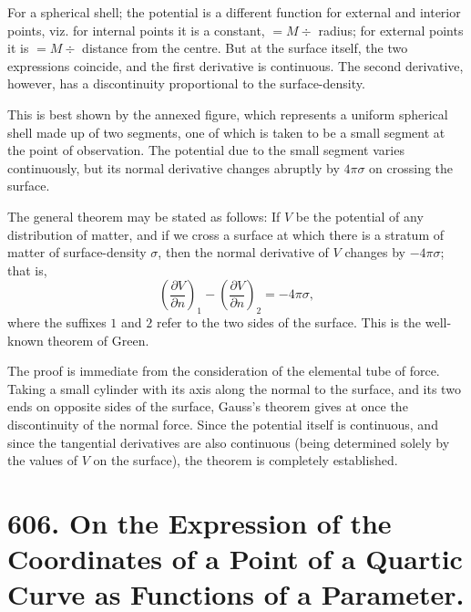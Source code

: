 \documentclass[11pt,a4paper]{book}
\begin{document}
\begin{art}
For a spherical shell; the potential is a different function for external and interior points, viz. for internal points it is a constant, $= M \div$ radius; for external points it is $= M \div$ distance from the centre. But at the surface itself, the two expressions coincide, and the first derivative is continuous. The second derivative, however, has a discontinuity proportional to the surface-density.
\end{art}

\begin{art}
This is best shown by the annexed figure, which represents a uniform spherical shell made up of two segments, one of which is taken to be a small segment at the point of observation. The potential due to the small segment varies continuously, but its normal derivative changes abruptly by $4\pi\sigma$ on crossing the surface.
\end{art}

\begin{art}
The general theorem may be stated as follows: If $V$ be the potential of any distribution of matter, and if we cross a surface at which there is a stratum of matter of surface-density $\sigma$, then the normal derivative of $V$ changes by $-4\pi\sigma$; that is,
\[
\left(\frac{\partial V}{\partial n}\right)_1 - \left(\frac{\partial V}{\partial n}\right)_2 = -4\pi\sigma,
\]
where the suffixes $1$ and $2$ refer to the two sides of the surface. This is the well-known theorem of Green.
\end{art}

\begin{art}
The proof is immediate from the consideration of the elemental tube of force. Taking a small cylinder with its axis along the normal to the surface, and its two ends on opposite sides of the surface, Gauss's theorem gives at once the discontinuity of the normal force. Since the potential itself is continuous, and since the tangential derivatives are also continuous (being determined solely by the values of $V$ on the surface), the theorem is completely established.
\end{art}


\newpage
\section[On the Expression of the Coordinates of a Point of a Quartic Curve as Functions of a Parameter]%
{606. On the Expression of the Coordinates of a Point of a Quartic Curve as Functions of a Parameter.}
\end{document}
